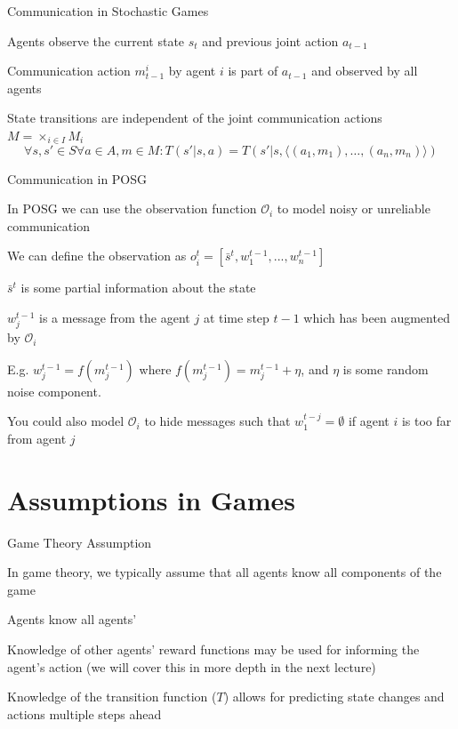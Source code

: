 \begin{frame}{Communication in Stochastic Games}
    \blist
        \item Agents observe the current state \( s_t \) and previous joint action \( a_{t-1} \) 
        \item Communication action \( m_{t-1}^i \) by agent \( i \) is part of \( a_{t-1} \) and observed by all agents
        \item State transitions are independent of the joint communication actions \( M = \times_{i \in I} M_i \)
    \elist
    \begin{equation*}
        \forall s, s' \in S \forall a \in A, m \in M : T(s'|s, a) = T(s'|s, \langle(a_{1}, m_{1}), \ldots, (a_{n}, m_{n})\rangle)
    \end{equation*}
\end{frame}

\begin{frame}{Communication in POSG}

    \blist
        \item In POSG we can use the observation function \(\mathcal{O}_i\) to model noisy or unreliable communication
        \item We can define the observation as \(o_{i}^{t} = [\bar{s}^t, w^{t-1}_{1}, ..., w^{t-1}_{n}]\)
        \blist
            \item \(\bar{s}^t\) is some partial information about the state 
            \item \(w_{j}^{t-1}\) is a message from the agent \(j\) at time step \(t-1\) which has been augmented by \(\mathcal{O}_i\)
            \item E.g. \(w_{j}^{t-1} = f(m_{j}^{t-1})\) where \(f(m_{j}^{t-1}) = m_{j}^{t-1} + \eta\), and \(\eta\) is some random noise component.
        \elist
        \item You could also model $\mathcal{O}_i$ to hide messages such that $w^{t-j}_{1} = \emptyset$  if agent $i$ is too far from agent $j$
    \elist
    
\end{frame}

\section{Assumptions in Games}

\begin{frame}{Game Theory Assumption}

    \blist
        \item  In game theory, we typically assume that all agents know all components of the game 
        \item Agents know all agents' 
        \item Knowledge of other agents' reward functions may be used for informing the agent's  action (we will cover this in more depth in the next lecture)
        \item Knowledge of the transition function (\( T \)) allows for predicting state changes and  actions multiple steps ahead
    \elist
    
\end{frame}

